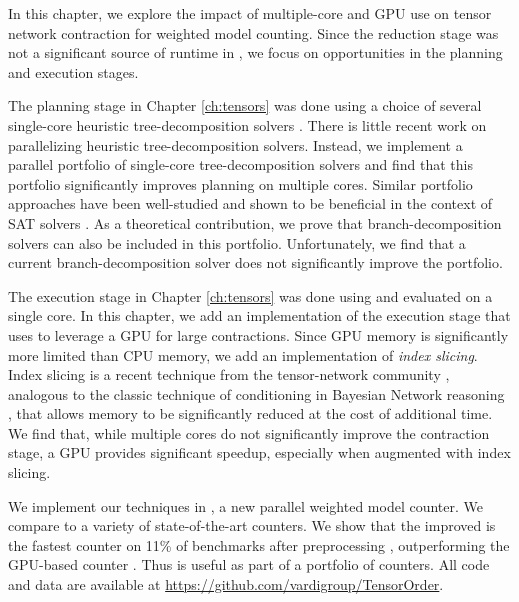 In this chapter, we explore the impact of multiple-core and GPU use on tensor network contraction for weighted model counting. Since the reduction stage was not a significant source of runtime in \cite{DDV19}, we focus on opportunities in the planning and execution stages. 


The planning stage in Chapter \ref{ch:tensors} was done using a choice of several single-core heuristic tree-decomposition solvers \cite{AMW17,HS18,Tamaki17}. There is little recent work on parallelizing heuristic tree-decomposition solvers. Instead, we implement a parallel portfolio of single-core tree-decomposition solvers and find that this portfolio significantly improves planning on multiple cores. Similar portfolio approaches have been well-studied and shown to be beneficial in the context of SAT solvers \cite{BSS15,XHHL08}. As a theoretical contribution, we prove that branch-decomposition solvers can also be included in this portfolio. Unfortunately, we find that a current branch-decomposition solver does not significantly improve the portfolio.

The execution stage in Chapter \ref{ch:tensors} was done using  \cite{numpy} and evaluated on a single core. In this chapter, we add an implementation of the execution stage that uses  \cite{ABCCDDDGII16} to leverage a GPU for large contractions. Since GPU memory is significantly more limited than CPU memory, we add an implementation of \emph{index slicing}. Index slicing is a recent technique from the tensor-network community \cite{CZHNS18,GK20,VBNHRBM19}, analogous to the classic technique of conditioning in Bayesian Network reasoning \cite{darwiche01,dechter99,pearl86,SAS94}, that allows memory to be significantly reduced at the cost of additional time. We find that, while multiple cores do not significantly improve the contraction stage, a GPU provides significant speedup, especially when augmented with index slicing.

We implement our techniques in , a new parallel weighted model counter. We compare  to a variety of state-of-the-art counters. We show that the improved  is the fastest counter on 11\% of benchmarks after preprocessing \cite{LM14}, outperforming the GPU-based counter  \cite{FHZ19}. Thus  is useful as part of a portfolio of counters. All code and data are available at  \url{https://github.com/vardigroup/TensorOrder}.

